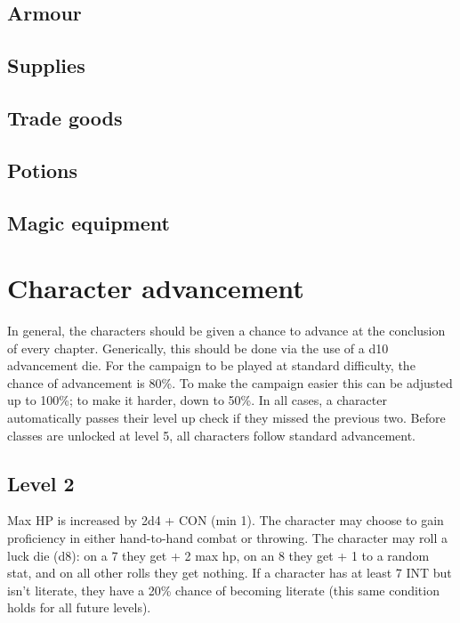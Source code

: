\documentclass[letterpaper,12pt]{article}
\begin{document}
\subsection{Armour}

\subsection{Supplies}

\subsection{Trade goods}

\subsection{Potions}

\subsection{Magic equipment}

\section{Character advancement}\label{LevelingUp}

In general, the characters should be given a chance to advance at the conclusion of every chapter. Generically, this should be done via the use of a d10 advancement die. For the campaign to be played at standard difficulty, the chance of advancement is 80\%. To make the campaign easier this can be adjusted up to 100\%; to make it harder, down to 50\%. In all cases, a character automatically passes their level up check if they missed the previous two. Before classes are unlocked at level 5, all characters follow standard advancement. 

\subsection{Level 2}

Max HP is increased by 2d4 + CON (min 1). The character may choose to gain proficiency in either hand-to-hand combat or throwing. The character may roll a luck die (d8): on a 7 they get + 2 max hp, on an 8 they get + 1 to a random stat, and on all other rolls they get nothing. If a character has at least 7 INT but isn't literate, they have a 20\% chance of becoming literate (this same condition holds for all future levels).
\end{document}
